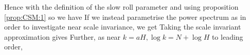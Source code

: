 \documentclass{article}
\begin{document}
Hence with the definition of the slow roll parameter and using proposition \ref{prop:CSM:1}
so we have 
If we instead parametrise the power spectrum as 
in order to investigate near scale invariance, we get 
Taking the scale invariant approximation gives 
Further, as near $k = aH, \log k = N + \log H $
to leading order, 
\end{document}
